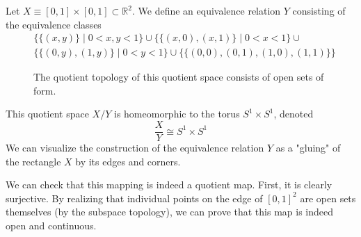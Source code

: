   \begin{example}
    Let $X \equiv [0,1] \times [0,1] \subset \mathbb{R}^2$. We define an equivalence relation $Y$ consisting of the equivalence classes
    \begin{align*}
        &\big\{\{(x, y)\} \; | \; 0<x, y<1\big\} \cup \big\{ \{(x, 0), (x,1)\} \; | \; 0<x<1 \big\} \cup \\
        &\big\{ \{(0,y), (1,y)\} \; | \; 0<y<1 \big\} \cup \big\{ \{(0,0), (0,1), (1,0), (1,1)\} \big\}
    \end{align*} 

    \begin{figure}[H]
      \centering 
      \caption{The quotient topology of this quotient space consists of open sets of form. } 
      \label{fig:torus_basis}
    \end{figure}
    This quotient space $X / Y$ is homeomorphic to the torus $S^1 \times S^1$, denoted
    \begin{equation}
      \frac{X}{Y} \cong S^1 \times S^1
    \end{equation}
    We can visualize the construction of the equivalence relation $Y$ as a "gluing" of the rectangle $X$ by its edges and corners. 

    We can check that this mapping is indeed a quotient map. First, it is clearly surjective. By realizing that individual points on the edge of $[0,1]^2$ are open sets themselves (by the subspace topology), we can prove that this map is indeed open and continuous. 
  \end{example}

